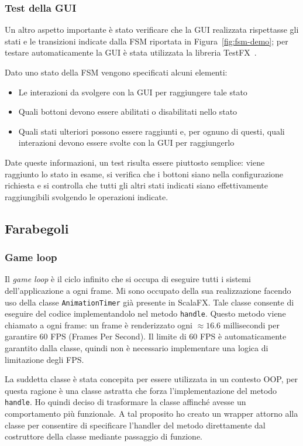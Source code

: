 \subsubsection{Test della GUI}
Un altro aspetto importante è stato verificare che la GUI realizzata rispettasse gli stati e le transizioni indicate
dalla FSM riportata in Figura~\ref{fig:fsm-demo};
per testare automaticamente la GUI è stata utilizzata la libreria TestFX~\cite{testfx}.

Dato uno stato della FSM vengono specificati alcuni elementi:
\begin{itemize}
    \item Le interazioni da svolgere con la GUI per raggiungere tale stato
    \item Quali bottoni devono essere abilitati o disabilitati nello stato
    \item Quali stati ulteriori possono essere raggiunti e, per ognuno di questi, quali interazioni devono essere svolte
    con la GUI per raggiungerlo
\end{itemize}
Date queste informazioni, un test risulta essere piuttosto semplice: viene raggiunto lo stato in esame, si verifica che
i bottoni siano nella configurazione richiesta e si controlla che tutti gli altri stati indicati siano effettivamente
raggiungibili svolgendo le operazioni indicate.

\subsection{Farabegoli}\label{subsec:demo-farabegoli}
\subsubsection{Game loop}
Il \textit{game loop} è il ciclo infinito che si occupa di eseguire tutti i sistemi dell'applicazione a ogni frame.
Mi sono occupato della sua realizzazione facendo uso della classe \texttt{AnimationTimer} già presente in ScalaFX\@.
Tale classe consente di eseguire del codice implementandolo nel metodo \texttt{handle}.
Questo metodo viene chiamato a ogni frame: un frame è renderizzato ogni $\approx16.6$ millisecondi per garantire 60 FPS
(Frames Per Second).
Il limite di 60 FPS è automaticamente garantito dalla classe, quindi non è necessario implementare una logica
di limitazione degli FPS\@.

La suddetta classe è stata concepita per essere utilizzata in un contesto OOP, per questa ragione è una classe astratta
che forza l'implementazione del metodo \texttt{handle}.
Ho quindi deciso di trasformare la classe affinché avesse un comportamento più funzionale.
A tal proposito ho creato un wrapper attorno alla classe per consentire di specificare l'handler del metodo direttamente
dal costruttore della classe mediante passaggio di funzione.

